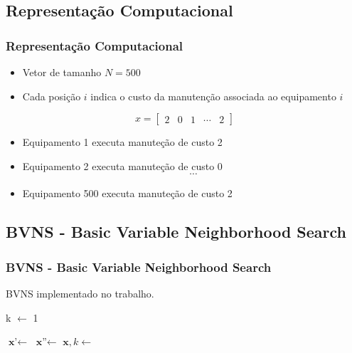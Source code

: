 \documentclass{beamer}
\begin{document}
\subsection{Representação Computacional}
    \begin{frame}
        \frametitle{Representação Computacional}

        \begin{itemize}
            \item Vetor de tamanho $N = 500$
            \item Cada posição $i$ indica o custo da manutenção associada ao equipamento $i$
        \end{itemize}

        \[ x = \begin{bmatrix} 2 & 0 & 1 & \cdots & 2 \end{bmatrix} \]

        \begin{itemize}
            \item Equipamento 1 executa manuteção de custo 2
            \item Equipamento 2 executa manuteção de custo 0
            \[  \cdots  \]
            \item Equipamento 500 executa manuteção de custo 2
        \end{itemize}
    \end{frame}


\subsection{BVNS - Basic Variable Neighborhood Search}
    \begin{frame}
        \frametitle{BVNS - Basic Variable Neighborhood Search}
        \begin{algorithm}[H]
            \caption{BVNS implementado no trabalho.}\label{alg:bvns}
            \begin{algorithmic}[1]
                    \State k $\gets$ 1
        
                        \State $ \textbf{x'} \gets$  
                        \State $ \textbf{x''} \gets$  
                        \State $ \textbf{x}, k \gets$  
                    \EndWhile
                \EndWhile
            \EndProcedure 
            \end{algorithmic}
        \end{algorithm}
    \end{frame}
\end{document}
